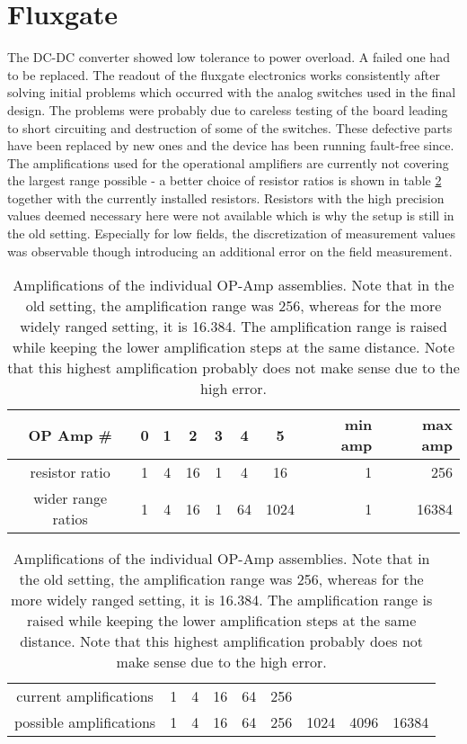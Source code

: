     \section{Fluxgate}
        The DC-DC converter showed low tolerance to power overload. A failed one had to be replaced.
        The readout of the fluxgate electronics works consistently after solving initial problems which occurred with the analog switches used in the final design. The problems were probably due to careless testing of the board leading to short circuiting and destruction of some of the switches. These defective parts have been replaced by new ones and the device has been running fault-free since.
        The amplifications used for the operational amplifiers are currently not covering the largest range possible - a better choice of resistor ratios is shown in table \ref{table:discussion:amplifications} together with the currently installed resistors.  Resistors with the high precision values deemed necessary here were not available which is why the setup is still in the old setting. Especially for low fields, the discretization of measurement values was observable though introducing an additional error on the field measurement.
        \begin{table}
            \centering
            \begin{tabular}{|c|ccc|ccc||rr|}
                \hline
                OP Amp \# & 0 & 1 & 2 & 3 & 4 & 5 & min amp& max amp\\
                \hline
                resistor ratio & 1 & 4 & 16 & 1 & 4 & 16 & 1 & 256\\
                wider range ratios & 1 & 4 & 16 & 1 & 64 & 1024& 1 & 16384\\
                \hline
            \end{tabular}
            \begin{tabular}{|c|cccccccc|}
                \hline
                current amplifications & 1 & 4 & 16 & 64 & 256 & & & \\
                possible amplifications & 1 & 4 & 16 & 64 & 256 & 1024 & 4096 & 16384\\
                \hline
            \end{tabular}
            \caption[OP-AMP amplifications]{Amplifications of the individual OP-Amp assemblies. Note that in the old setting, the amplification range was 256, whereas for the more widely ranged setting, it is 16.384. The amplification range is raised while keeping the lower amplification steps at the same distance. Note that this highest amplification probably does not make sense due to the high error.}
            \label{table:discussion:amplifications}
        \end{table}
